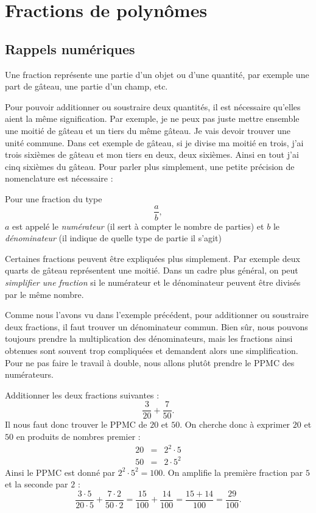 \chapter{Fractions de polynômes}

\section{Rappels numériques}
Une fraction représente une partie d'un objet ou d'une quantité, par exemple une part de gâteau, une partie d'un champ, etc.

Pour pouvoir additionner ou soustraire deux quantités, il est nécessaire qu'elles aient la même signification. Par exemple, je ne peux pas juste mettre ensemble une moitié de gâteau et un tiers du même gâteau. Je vais devoir trouver une unité commune. Dans cet exemple de gâteau, si je divise ma moitié en trois, j'ai trois sixièmes de gâteau et mon tiers en deux, deux sixièmes. Ainsi en tout j'ai cinq sixièmes du gâteau. Pour parler plus simplement, une petite précision de nomenclature est nécessaire :

\begin{definition}
Pour une fraction du type
$$
\frac{a}{b},
$$
$a$ est appelé le \emph{numérateur} (il sert à compter le nombre de parties) et $b$ le \emph{dénominateur} (il indique de quelle type de partie il s'agit)
\end{definition}

Certaines fractions peuvent être expliquées plus simplement. Par exemple deux quarts de gâteau représentent une moitié. Dans un cadre plus général, on peut \emph{simplifier une fraction} si le numérateur et le dénominateur peuvent être divisés par le même nombre.

Comme nous l'avons vu dans l'exemple précédent, pour additionner ou soustraire deux fractions, il faut trouver un dénominateur commun. Bien sûr, nous pouvons toujours prendre la multiplication des dénominateurs, mais les fractions ainsi obtenues sont souvent trop compliquées et demandent alors une simplification. Pour ne pas faire le travail à double, nous allons plutôt prendre le PPMC des numérateurs.

\begin{exemple}
Additionner les deux fractions suivantes :
$$
\frac{3}{20} + \frac{7}{50}.
$$
Il nous faut donc trouver le PPMC de $20$ et $50$. On cherche donc à exprimer $20$ et $50$ en produits de nombres premier :
$$
\begin{array}{lcl}
20 &=& 2^2 \cdot 5 \\
50 &=& 2 \cdot 5^2
\end{array}
$$
Ainsi le PPMC est donné par $2^2\cdot 5^2 = 100$. On amplifie la première fraction par $5$ et la seconde par $2$ :
$$
\frac{3\cdot 5}{20 \cdot 5} + \frac{7 \cdot 2}{50 \cdot 2} = \frac{15}{100} + \frac{14}{100} = \frac{15 +14}{100} = \frac{29}{100}.
$$
\end{exemple}

